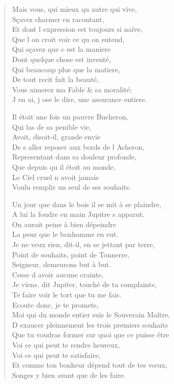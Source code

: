 \documentclass[14pt,a4paper]{memoir}
\begin{document}
{{\begin{otherlanguage}{french}
\begin{verse}
\vin Mais vous, qui mieux qu\textquotesingle{} autre qui vive, \\
\vin Sçavez charmer en racontant, \\
Et dont l\textquotesingle{} expression est toujours si naïve, \\
\vin Que l\textquotesingle{} on croit voir ce qu\textquotesingle{} on entend, \\
\vin Qui sçavez que c\textquotesingle{} est la maniere \\
\vin Dont quelque chose est inventé, \\
\vin Qui beaucoup plus que la matiere, \\
\vin De tout recit fait la beauté, \\
Vous aimerez ma Fable \& sa moralité; \\
J\textquotesingle{} en ai, j\textquotesingle{} ose le dire, une assurance entiere.

Il étoit une fois un pauvre Bucheron, \\
\vin Qui las de sa penible vie, \\
\vin Avoit, disoit-il, grande envie \\
De s\textquotesingle{} aller reposer aux bords de l\textquotesingle{} Acheron, \\
\vin Representant dans sa douleur profonde, \\
\vin Que depuis qu\textquotesingle{} il étoit au monde, \\
\vin Le Ciel cruel n\textquotesingle{} avoit jamais \\
Voulu remplir un seul de ses souhaits.

Un jour que dans le bois il se mit à se plaindre, \\
A lui la foudre en main Jupitre s\textquotesingle{} apparut. \\
\vin On auroit peine à bien dépeindre \\
\vin La peur que le bonhomme en eut. \\
Je ne veux rien, dit-il, en se jettant par terre, \\
\vin Point de souhaits, point de Tonnerre, \\
\vin Seigneur, demeurons but à but. \\
\vin Cesse d\textquotesingle{} avoir aucune crainte, \\
Je viens, dit Jupiter, touché de ta complainte, \\
\vin Te faire voir le tort que tu me fais. \\
\vin Ecoute donc, je te promets, \\
Moi qui du monde entier suis le Souverain Maître, \\
D\textquotesingle{} exaucer pleinnement les trois premiers souhaits \\
Que tu voudras former sur quoi que ce puisse être \\
\vin Voi ce qui peut te rendre heureux, \\
\vin Voi ce qui peut te satisfaire, \\
Et comme ton bonheur dépend tout de tes vœux, \\
\vin Songes y bien avant que de les faire.


\end{verse}
\end{otherlanguage}}}
\end{document}
